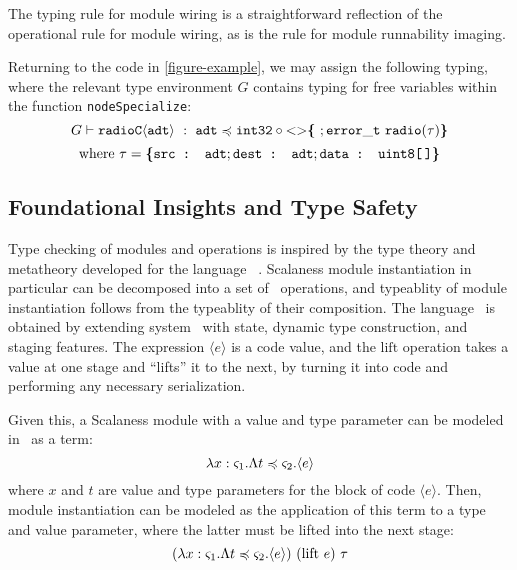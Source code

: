 The  typing rule for module wiring is a straightforward reflection of the
operational rule for module wiring, as is the  rule for module runnability
imaging.
\begin{example}
\label{example-scalanesstyping}
Returning to the code in \autoref{figure-example}, we may assign the following typing, where the
relevant type environment $G$ contains typing for free variables within the function
\texttt{nodeSpecialize}:
$$
  G \vdash \mathtt{radioC\langle adt \rangle}\ :\  
    \texttt{adt} \preccurlyeq \texttt{int32} \circ \mathrm{<}\mathrm{>}\textup{\textbf{\{}}\ ;
      \mathtt{error\_t\ radio(\tau)} \textup{\textbf{\}}}
$$
$$
\text{where}\ \tau = \textup{\textbf{\{}} \texttt{src : adt}; \texttt{dest : adt}; \texttt{data : uint8[\,]} \textup{\textbf{\}}} 
$$
\end{example}

\subsection{Foundational Insights and Type Safety} 
\label{section-framedml}

Type checking of modules and operations is inspired by the type theory and metatheory developed
for the language \fml\ \cite{FramedML}. Scalaness module instantiation in particular can be
decomposed into a set of \fml\ operations, and typeablity of module instantiation follows from
the typeablity of their composition. The language \fml\ is obtained by extending system \fsub\
with state, dynamic type construction, and staging features. The expression $\langle e \rangle$
is a code value, and the $\mathrm{lift}$ operation takes a value at one stage and ``lifts'' it
to the next, by turning it into code and performing any necessary serialization.

Given this, a Scalaness module with a value and type parameter can be
modeled in \fml\ as a term: 
$$\lambda x : \varsigma_1 . \Lambda t \preccurlyeq \varsigma_2 . \langle e \rangle$$
where $x$ and $t$ are value and type parameters for the block of code $\langle e \rangle$. Then,
module instantiation can be modeled as the application of this term to a type and value
parameter, where the latter must be lifted into the next stage:
$$
(\lambda x : \s_1 . \Lambda t \subtype \s_2 . \langle e \rangle)\ (\mathrm{lift}\ e)\ \t
$$ 

